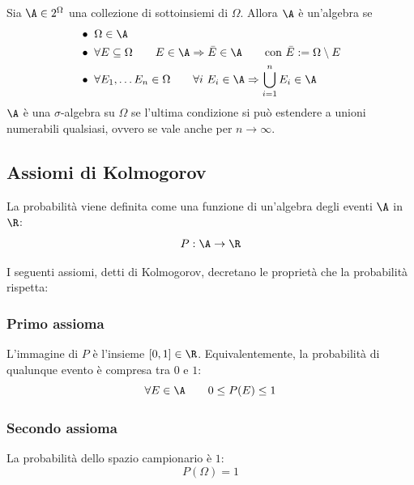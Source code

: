 \begin{defin}
	Sia $\A\in2^\Omega$ una collezione di sottoinsiemi di $\Omega$. Allora $\A$ è un'algebra se
	\begin{align*}
		 & \bullet ~ \Omega\in \A                                                                                            		\\
		 & \bullet ~ \forall E\subseteq\Omega\qquad E\in\A\Rightarrow \bar E\in\A \qquad\text{con }\bar E:=\Omega\setminus E \\
		 & \bullet ~ \forall E_1,\dots E_n\in\Omega\qquad \forall i~E_i\in\A\Rightarrow \bigcup\limits_{i=1}^n E_i \in\A
	\end{align*}
	$\A$ è una $\sigma$-algebra su $\Omega$ se l'ultima condizione si può estendere a unioni numerabili qualsiasi, ovvero se vale anche per $n \rightarrow \infty$.
\end{defin} %



\subsection{Assiomi di Kolmogorov}
La probabilità viene definita come una funzione di un'algebra degli eventi $\A$ in $\R$:
\begin{equation*}
	P:\A\to\R
\end{equation*}

I seguenti assiomi, detti di Kolmogorov, decretano le proprietà che la probabilità rispetta:


\subsubsection{Primo assioma}
L'immagine di $P$ è l'insieme $[0,1]\in\R$. Equivalentemente, la probabilità di qualunque evento è compresa tra $0$ e $1$:
\begin{equation*}
	\forall E\in\A\qquad 0\leq P(E)\leq 1
\end{equation*}


\subsubsection{Secondo assioma}
La probabilità dello spazio campionario è $1$:
\begin{equation*}
	P(\Omega)=1
\end{equation*}



